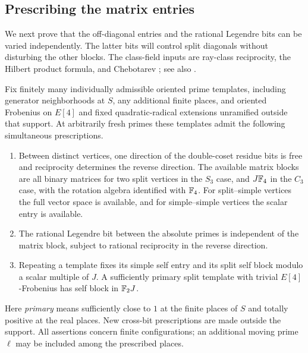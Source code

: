 \subsection{Prescribing the matrix entries}

We next prove that the off-diagonal entries and the rational Legendre
bits can be varied independently. The latter bits will control split
diagonals without disturbing the other blocks. The class-field inputs
are ray-class reciprocity, the Hilbert product formula, and Chebotarev
\citep[Chapter~VI, Sections~7--8, and Chapter~VII, Section~13]{Neukirch1999};
see also \citet[Chapter~V, Theorems~3.23, 5.3 and~5.5,
and Example~5.4]{MilneCFT2020}.

\begin{lemma}
\label{lem:lm:arithmetic-realization}
Fix finitely many individually admissible oriented prime templates,
including generator neighborhoods at $S$, any additional finite places,
and oriented Frobenius on $E[4]$ and fixed quadratic-radical extensions
unramified outside that support. At arbitrarily fresh primes these
templates admit the following simultaneous prescriptions.
\begin{enumerate}[label=\textup{(\roman*)}]
\item Between distinct vertices, one direction of the double-coset
residue bits is free and reciprocity determines the reverse direction.
The available matrix blocks are all binary matrices for two split
vertices in the $S_3$ case, and $J\mathbb F_4$ in the $C_3$ case, with the
rotation algebra identified with $\mathbb F_4$. For split--simple vertices
the full vector space is available, and for simple--simple vertices
the scalar entry is available.
\item The rational Legendre bit between the absolute primes is
independent of the matrix block, subject to rational reciprocity in
the reverse direction.
\item Repeating a template fixes its simple self entry and its split
self block modulo a scalar multiple of $J$. A sufficiently primary
split template with trivial $E[4]$-Frobenius has self block in $\mathbb F_2J$.
\end{enumerate}
Here \emph{primary} means sufficiently close to $1$ at the finite
places of $S$ and totally positive at the real places. New cross-bit
prescriptions are made outside the support. All assertions concern
finite configurations; an additional moving prime $\ell$ may be
included among the prescribed places.
\end{lemma}

